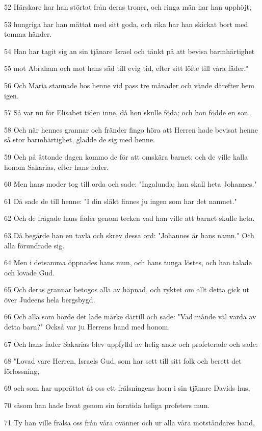 \par 52 Härskare har han störtat från deras troner, och ringa män har han upphöjt;
\par 53 hungriga har han mättat med sitt goda, och rika har han skickat bort med tomma händer.
\par 54 Han har tagit sig an sin tjänare Israel och tänkt på att bevisa barmhärtighet
\par 55 mot Abraham och mot hans säd till evig tid, efter sitt löfte till våra fäder."
\par 56 Och Maria stannade hos henne vid pass tre månader och vände därefter hem igen.
\par 57 Så var nu för Elisabet tiden inne, då hon skulle föda; och hon födde en son.
\par 58 Och när hennes grannar och fränder fingo höra att Herren hade bevisat henne så stor barmhärtighet, gladde de sig med henne.
\par 59 Och på åttonde dagen kommo de för att omskära barnet; och de ville kalla honom Sakarias, efter hans fader.
\par 60 Men hans moder tog till orda och sade: "Ingalunda; han skall heta Johannes."
\par 61 Då sade de till henne: "I din släkt finnes ju ingen som har det namnet."
\par 62 Och de frågade hans fader genom tecken vad han ville att barnet skulle heta.
\par 63 Då begärde han en tavla och skrev dessa ord: "Johannes är hans namn." Och alla förundrade sig.
\par 64 Men i detsamma öppnades hans mun, och hans tunga löstes, och han talade och lovade Gud.
\par 65 Och deras grannar betogos alla av häpnad, och ryktet om allt detta gick ut över Judeens hela bergsbygd.
\par 66 Och alla som hörde det lade märke därtill och sade: "Vad månde väl varda av detta barn?" Också var ju Herrens hand med honom.
\par 67 Och hans fader Sakarias blev uppfylld av helig ande och profeterade och sade:
\par 68 "Lovad vare Herren, Israels Gud, som har sett till sitt folk och berett det förlossning,
\par 69 och som har upprättat åt oss ett frälsningens horn i sin tjänare Davids hus,
\par 70 såsom han hade lovat genom sin forntida heliga profeters mun.
\par 71 Ty han ville frälsa oss från våra ovänner och ur alla våra motståndares hand,
